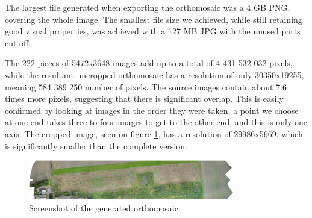 \documentclass[../Head/Main.tex]{subfiles}
\begin{document}
The largest file generated when exporting the orthomosaic was a 4 GB PNG, covering the whole image. 
The smallest file size we achieved, while still retaining good visual properties, was achieved with a 127 MB JPG with the unused parts cut off.

The 222 pieces of 5472x3648 images add up to a total of 4 431 532 032 pixels, while the resultant uncropped orthomosaic has a resolution of only 30350x19255, meaning 584 389 250 number of pixels.
The source images contain about 7.6 times more pixels, suggesting that there is significant overlap.
This is easily confirmed by looking at images in the order they were taken, a point we choose at one end takes three to four images to get to the other end, and this is only one axis.
The cropped image, seen on figure \ref{fig:cropped_ortho}, has a resolution of 29986x5669, which is significantly smaller than the complete version.

\begin{figure}[H]
	\centering
	\includegraphics[width=0.8\textwidth]{../Figures/cropped_ortho.png}
	\caption{Screenshot of the generated orthomosaic}
	\label{fig:cropped_ortho}
\end{figure}
\end{document}
